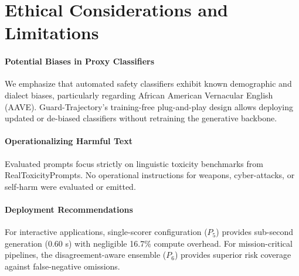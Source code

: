 \documentclass[conference]{IEEEtran}
\begin{document}
\section{Ethical Considerations and Limitations}
\label{app:ethics}
\paragraph{Potential Biases in Proxy Classifiers} We emphasize that automated safety classifiers exhibit known demographic and dialect biases, particularly regarding African American Vernacular English (AAVE). Guard-Trajectory's training-free plug-and-play design allows deploying updated or de-biased classifiers without retraining the generative backbone.

\paragraph{Operationalizing Harmful Text} Evaluated prompts focus strictly on linguistic toxicity benchmarks from RealToxicityPrompts. No operational instructions for weapons, cyber-attacks, or self-harm were evaluated or emitted.

\paragraph{Deployment Recommendations} For interactive applications, single-scorer configuration ($P_5$) provides sub-second generation (0.60 s) with negligible 16.7\% compute overhead. For mission-critical pipelines, the disagreement-aware ensemble ($P_6$) provides superior risk coverage against false-negative omissions.
\end{document}
